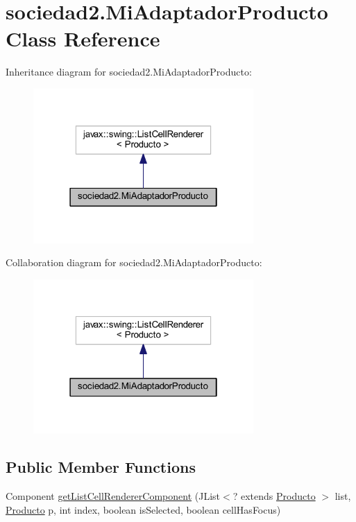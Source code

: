 \hypertarget{classsociedad2_1_1_mi_adaptador_producto}{}\section{sociedad2.\+Mi\+Adaptador\+Producto Class Reference}
\label{classsociedad2_1_1_mi_adaptador_producto}


Inheritance diagram for sociedad2.\+Mi\+Adaptador\+Producto\+:\nopagebreak
\begin{figure}[H]
\begin{center}
\leavevmode
\includegraphics[width=238pt]{classsociedad2_1_1_mi_adaptador_producto__inherit__graph}
\end{center}
\end{figure}


Collaboration diagram for sociedad2.\+Mi\+Adaptador\+Producto\+:\nopagebreak
\begin{figure}[H]
\begin{center}
\leavevmode
\includegraphics[width=238pt]{classsociedad2_1_1_mi_adaptador_producto__coll__graph}
\end{center}
\end{figure}
\subsection*{Public Member Functions}
\begin{DoxyCompactItemize}
\item 
Component \mbox{\hyperlink{classsociedad2_1_1_mi_adaptador_producto_af202727879511339e4a8916d8e7f3be5}{get\+List\+Cell\+Renderer\+Component}} (J\+List$<$? extends \mbox{\hyperlink{classsociedad2_1_1_producto}{Producto}} $>$ list, \mbox{\hyperlink{classsociedad2_1_1_producto}{Producto}} p, int index, boolean is\+Selected, boolean cell\+Has\+Focus)
\end{DoxyCompactItemize}


